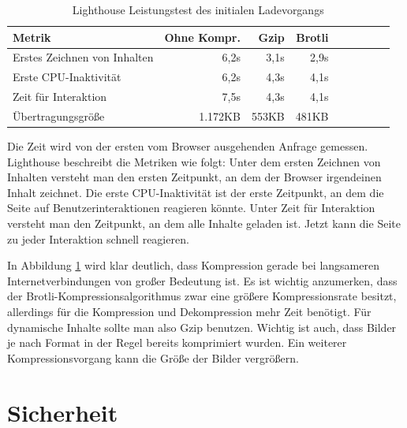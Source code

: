 \begin{table}[h]
\begin{center}
\begin{tabular}{l*{8}{r}}
Metrik & Ohne Kompr. & Gzip & Brotli \\
\hline
Erstes Zeichnen von Inhalten & 6,2s  & 3,1s & 2,9s \\
Erste CPU-Inaktivität        & 6,2s  & 4,3s & 4,1s \\
Zeit für Interaktion         & 7,5s  & 4,3s & 4,1s \\
Übertragungsgröße            & 1.172KB  &  553KB & 481KB \\
\end{tabular}
\end{center}
\caption{Lighthouse Leistungstest des initialen Ladevorgangs}
\label{tab:lighthouseleistungstestdesinitialenladevorgangs}
\end{table}

Die Zeit wird von der ersten vom Browser ausgehenden Anfrage gemessen.
Lighthouse beschreibt die Metriken wie folgt: Unter dem ersten Zeichnen
von Inhalten versteht man den ersten Zeitpunkt, an dem der Browser
irgendeinen Inhalt zeichnet. Die erste CPU-Inaktivität ist
der erste Zeitpunkt, an dem die Seite auf Benutzerinteraktionen reagieren könnte.
Unter Zeit für Interaktion versteht man den Zeitpunkt, an dem alle Inhalte geladen ist.
Jetzt kann die Seite zu jeder Interaktion schnell reagieren.\cite{WhatPerformanceMetricsMeasure}

In Abbildung \ref{tab:lighthouseleistungstestdesinitialenladevorgangs} wird klar deutlich,
dass Kompression gerade bei langsameren Internetverbindungen von großer Bedeutung ist.
Es ist wichtig anzumerken, dass der Brotli-Kompressionsalgorithmus zwar eine größere
Kompressionsrate besitzt, allerdings für die Kompression und Dekompression mehr Zeit
benötigt.\cite{CompressionBenchmark} Für dynamische Inhalte sollte man also Gzip
benutzen. Wichtig ist auch, dass Bilder je nach Format in der Regel bereits komprimiert wurden.
Ein weiterer Kompressionsvorgang kann die Größe der Bilder vergrößern.

\section{Sicherheit}
\label{sec:sicherheit}